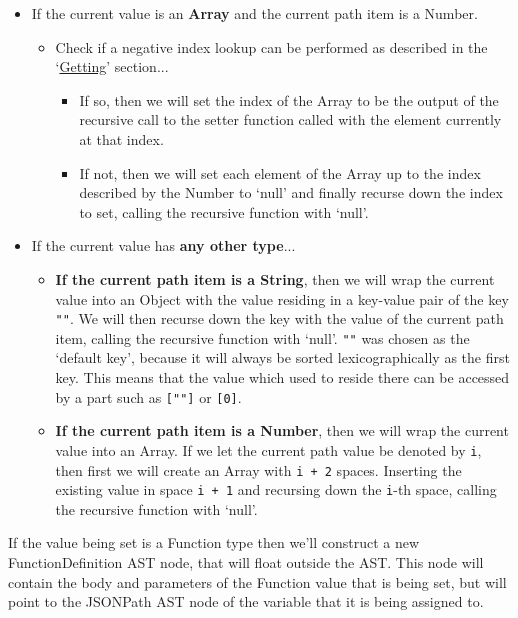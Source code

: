 \begin{center}
\begin{itemize}
\begin{itemize}
            \item If the current value is an \textbf{Array} and the current path item is a Number.
            \begin{itemize}
                \item Check if a negative index lookup can be performed as described in the `\hyperref[sec:jsonpath-getting]{Getting}' section...
                \begin{itemize}
                    \item If so, then we will set the index of the Array to be the output of the recursive call to the setter function called with the element currently at that index.
                    \item If not, then we will set each element of the Array up to the index described by the Number to `null' and finally recurse down the index to set, calling the recursive function with `null'.
                \end{itemize}
            \end{itemize}
            \item If the current value has \textbf{any other type}...
            \begin{itemize}
                \item \textbf{If the current path item is a String}, then we will wrap the current value into an Object with the value residing in a key-value pair of the key \verb|""|. We will then recurse down the key with the value of the current path item, calling the recursive function with `null'. \verb|""| was chosen as the `default key', because it will always be sorted lexicographically as the first key. This means that the value which used to reside there can be accessed by a part such as \verb|[""]| or \verb|[0]|.
                \item \textbf{If the current path item is a Number}, then we will wrap the current value into an Array. If we let the current path value be denoted by \verb|i|, then first we will create an Array with \verb|i + 2| spaces. Inserting the existing value in space \verb|i + 1| and recursing down the \verb|i|-th space, calling the recursive function with `null'.
            \end{itemize}
        \end{itemize}
    \end{itemize}
\end{center}

If the value being set is a Function type then we'll construct a new FunctionDefinition AST node, that will float outside the AST. This node will contain the body and parameters of the Function value that is being set, but will point to the JSONPath AST node of the variable that it is being assigned to.


